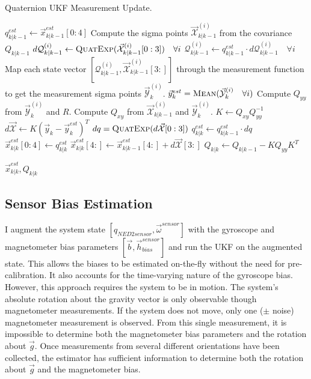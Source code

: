 \documentclass[conference]{IEEEtran}
\begin{document}
\begin{algorithm}
  \caption{Quaternion UKF Measurement Update.}
  \label{alg:updatemeas}
  \begin{algorithmic}
      \State $q_{k|k-1}^{est} \gets \vec{x}_{k|k-1}^{est}[0:4]$
      \State Compute the sigma points $\vec{\mathcal{X}}^{(i)}_{k|k-1}$ from the covariance $Q_{k|k-1}$
      \State $d\mathcal{Q}^{(i)}_{k|k-1} \gets \textproc{QuatExp}(\vec{\mathcal{X}}^{(i)}_{k|k-1}[0:3]) \quad \forall i$
      \State $\mathcal{Q}^{(i)}_{k|k-1} \gets q_{k|k-1}^{est} \cdot d\mathcal{Q}^{(i)}_{k|k-1} \quad \forall i$
      \State Map each state vector $[\mathcal{Q}^{(i)}_{k|k-1}, \vec{\mathcal{X}}^{(i)}_{k|k-1}[3:]]$ through the measurement function to get the measurement sigma points $\vec{\mathcal{Y}}^{(i)}_{k}$.
      \State $\vec{y}^{est}_{k} = \textproc{Mean}(\vec{\mathcal{Y}}^{(i)}_{k} \quad \forall i)$
      \State Compute $Q_{yy}$ from $\vec{\mathcal{Y}}^{(i)}_{k}$ and $R$.
      \State Compute $Q_{xy}$ from $\vec{\mathcal{X}}^{(i)}_{k|k-1}$ and $\vec{\mathcal{Y}}^{(i)}_{k}$.
      \State $K \gets Q_{xy} Q_{yy}^{-1}$
      \State $d\vec{\mathcal{X}} \gets K (\vec{y}_{k} - \vec{y}^{est}_{k})^T$
      \State $dq = \textproc{QuatExp}(d\vec{\mathcal{X}}[0:3])$
      \State $q_{k|k}^{est} \gets q_{k|k-1}^{est} \cdot dq$
      \State $\vec{x}^{est}_{k|k}[0:4] \gets q_{k|k}^{est}$
      \State $\vec{x}^{est}_{k|k}[4:] \gets \vec{x}^{est}_{k|k-1}[4:] + d\vec{\mathcal{X}}[3:]$
      \State $Q_{k|k} \gets Q_{k|k-1} - K Q_{yy} K^T$

      \Return $\vec{x}_{k|k}^{est}, Q_{k|k}$
    \EndFunction
  \end{algorithmic}
\end{algorithm}

\subsection{Sensor Bias Estimation}
I augment the system state $[q_{NED2sensor}, \vec{\omega}^{sensor}]$ with the gyroscope and magnetometer bias parameters $[\vec{b}, \vec{h}^{sensor}_{bias}]$ and run the UKF on the augmented state. This allows the biases to be estimated on-the-fly without the need for pre-calibration. It also accounts for the time-varying nature of the gyroscope bias. However, this approach requires the system to be in motion. The system's absolute rotation about the gravity vector is only observable though magnetometer measurements. If the system does not move, only one ($\pm$ noise) magnetometer measurement is observed. From this single measurement, it is impossible to determine both the magnetometer bias parameters and the rotation about $\vec{g}$. Once measurements from several different orientations have been collected, the estimator has sufficient information to determine both the rotation about $\vec{g}$ and the magnetometer bias.
\end{document}
